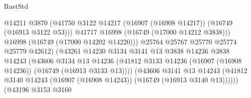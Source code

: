\begin{lexlean}{RustStd}
\begin{coremodule}
                                              @14211
                                              @3870
                                              (@41750
                                                @3122
                                                @14217
                                                (@16907 (@16908 @14217))
                                                (@16749 (@16913 @3122 @53)))
                                              @41717
                                              @16998
                                              (@16749 (@17000 @14212 @3838)))
                                            @16998
                                            (@16749 (@17000 @14202 @14220)))
                                          @25764
                                          @25767
                                          @25770
                                          @25774
                                          @25779
                                          @42612)
                                        (@43261
                                          @14230
                                          @3134
                                          @3141
                                          @13
                                          @3838
                                          @14236
                                          @3838
                                          @14243
                                          (@43606
                                            @3134
                                            @13
                                            @14236
                                            (@41812
                                              @3133
                                              @14236
                                              (@16907 (@16908 @14236))
                                              (@16749 (@16913 @3133 @13))))
                                          (@43606
                                            @3141
                                            @13
                                            @14243
                                            (@41812
                                              @3140
                                              @14243
                                              (@16907 (@16908 @14243))
                                              (@16749 (@16913 @3140 @13))))))
                                      (@43196
                                        @3153
                                        @3160

\end{coremodule}
\end{lexlean}
